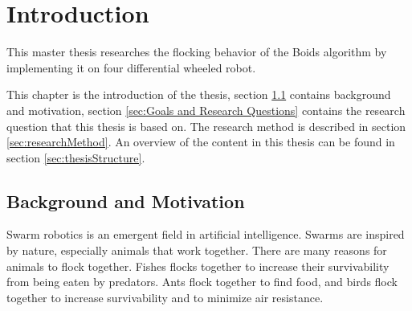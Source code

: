 \chapter{Introduction}
\label{cha:Introduction}

This master thesis researches the flocking behavior of the Boids algorithm by implementing it on four differential wheeled robot.

This chapter is the introduction of the thesis, section \ref{sec:BackgroundAndMotivation} contains background and motivation, section \ref{sec:Goals and Research Questions} contains the research question that this thesis is based on. The research method is described in section \ref{sec:researchMethod}. An overview of the content in this thesis can be found in section \ref{sec:thesisStructure}.



\section{Background and Motivation}
\label{sec:BackgroundAndMotivation}

Swarm robotics is an emergent field in artificial intelligence. Swarms are inspired by nature, especially animals that work together. There are many reasons for animals to flock together. Fishes flocks together to increase their survivability from being eaten by predators. Ants flock together to find food, and birds flock together to increase survivability and to minimize air resistance.

